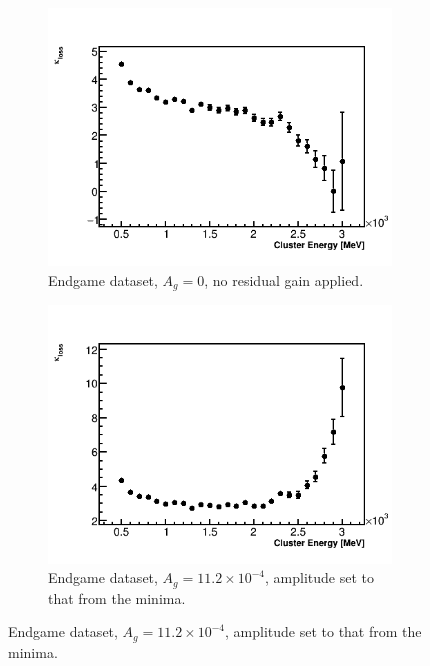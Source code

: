 \begin{landscape}
\begin{figure}[h]
    \begin{subfigure}[t]{0.34\textwidth}
        \centering
        \includegraphics[width=\textwidth]{TMethod_kappa_loss_Vs_EBin_Canv_EG-0}
        \caption{Endgame dataset, $A_{g} = 0$, no residual gain applied.}
    \end{subfigure}%
    \hspace{1cm}
    \begin{subfigure}[t]{0.34\textwidth}
        \centering
        \includegraphics[width=\textwidth]{TMethod_kappa_loss_Vs_EBin_Canv_EG-11p2}
        \caption{Endgame dataset, $A_{g} = 11.2 \times 10^{-4}$, amplitude set to that from the \chisq minima.}
    \end{subfigure}

\end{figure}
\end{landscape}
